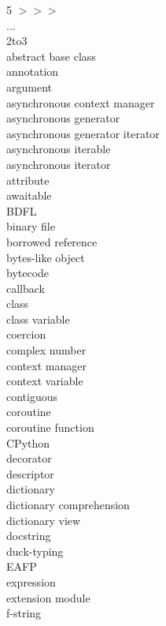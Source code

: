 \documentclass [8pt] {extarticle}
\begin{document}
    \begin {multicols} {5}
        $ >>> $ \\
        ... \\
        2to3 \\
        abstract base class \\
        annotation \\
        argument \\
        asynchronous context manager \\
        asynchronous generator \\
        asynchronous generator iterator \\
        asynchronous iterable \\
        asynchronous iterator \\
        attribute \\
        awaitable \\
        BDFL \\
        binary file \\
        borrowed reference \\
        bytes-like object \\
        bytecode \\
        callback \\
        class \\
        class variable \\
        coercion \\
        complex number \\
        context manager \\
        context variable \\
        contiguous \\
        coroutine \\
        coroutine function \\
        CPython \\
        decorator \\
        descriptor \\
        dictionary \\
        dictionary comprehension \\
        dictionary view \\
        docstring \\
        duck-typing \\
        EAFP \\
        expression \\
        extension module \\
        f-string \\

\end{multicols}
\end{document}
